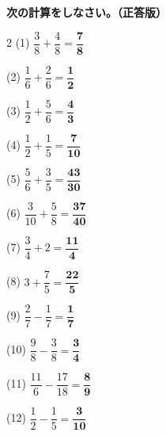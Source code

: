 \documentclass[a4paper, 11pt]{ltjsarticle}
\begin{document}
\hspace{1em} {\Large \textbf{次の計算をしなさい。（正答版）}}
\hfill


\vspace*{5ex}

\begin{multicols*}{2}
\noindent (1) \quad $\dfrac{3}{8}+\dfrac{4}{8} = \mathbf{\dfrac{7}{8}}$
\vspace*{\fill}

\noindent (2) \quad $\dfrac{1}{6}+\dfrac{2}{6} = \mathbf{\dfrac{1}{2}}$
\vspace*{\fill}

\noindent (3) \quad $\dfrac{1}{2}+\dfrac{5}{6} = \mathbf{\dfrac{4}{3}}$
\vspace*{\fill}

\noindent (4) \quad $\dfrac{1}{2}+\dfrac{1}{5} = \mathbf{\dfrac{7}{10}}$
\vspace*{\fill}

\noindent (5) \quad $\dfrac{5}{6}+\dfrac{3}{5} = \mathbf{\dfrac{43}{30}}$
\vspace*{\fill}

\noindent (6) \quad $\dfrac{3}{10}+\dfrac{5}{8} = \mathbf{\dfrac{37}{40}}$
\vspace*{\fill}

\noindent (7) \quad $\dfrac{3}{4}+2 = \mathbf{\dfrac{11}{4}}$
\vspace*{\fill}

\noindent (8) \quad $3+\dfrac{7}{5} = \mathbf{\dfrac{22}{5}}$
\vspace*{\fill}
\columnbreak

\noindent (9) \quad $\dfrac{2}{7}-\dfrac{1}{7} = \mathbf{\dfrac{1}{7}}$
\vspace*{\fill}

\noindent (10) \quad $\dfrac{9}{8}-\dfrac{3}{8} = \mathbf{\dfrac{3}{4}}$
\vspace*{\fill}

\noindent (11) \quad $\dfrac{11}{6}-\dfrac{17}{18} = \mathbf{\dfrac{8}{9}}$
\vspace*{\fill}

\noindent (12) \quad $\dfrac{1}{2}-\dfrac{1}{5} = \mathbf{\dfrac{3}{10}}$
\vspace*{\fill}


\end{multicols*}
\end{document}
